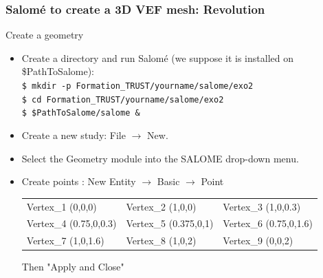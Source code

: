 \documentclass[10pt, hyperref={unicode=true,pdfusetitle, bookmarks=true,bookmarksnumbered=false,bookmarksopen=false, breaklinks=false,pdfborder={0 0 1},backref=true,colorlinks=true,linkcolor=darkblue,pageanchor}]{beamer}
\begin{document}
\begin{frame}
\frametitle{Salom\'e to create a 3D VEF mesh: Revolution}
\begin{block}{Create a geometry}

\begin{itemize}
\item Create a directory and run Salom\'e (we suppose it is installed on \$PathToSalome):\\
\texttt{\$ mkdir -p Formation\_TRUST/yourname/salome/exo2} \\
\texttt{\$ cd Formation\_TRUST/yourname/salome/exo2} \\
\texttt{\$ \$PathToSalome/salome \&} 

\item Create a new study: File $\rightarrow$ New.

\item Select the Geometry module into the SALOME drop-down menu.

\item Create points : New Entity $\rightarrow$ Basic $\rightarrow$ Point\\
\begin{tabular}{lll}
Vertex\_1 (0,0,0)       &   Vertex\_2 (1,0,0)       &   Vertex\_3 (1,0,0.3) \tabularnewline
Vertex\_4 (0.75,0,0.3)  &   Vertex\_5 (0.375,0,1)   &   Vertex\_6 (0.75,0,1.6) \tabularnewline
Vertex\_7 (1,0,1.6)     &   Vertex\_8 (1,0,2)       &   Vertex\_9 (0,0,2) \tabularnewline
\end{tabular}

Then "Apply and Close"

\end{itemize}

\end{block}
\end{frame}
\end{document}
